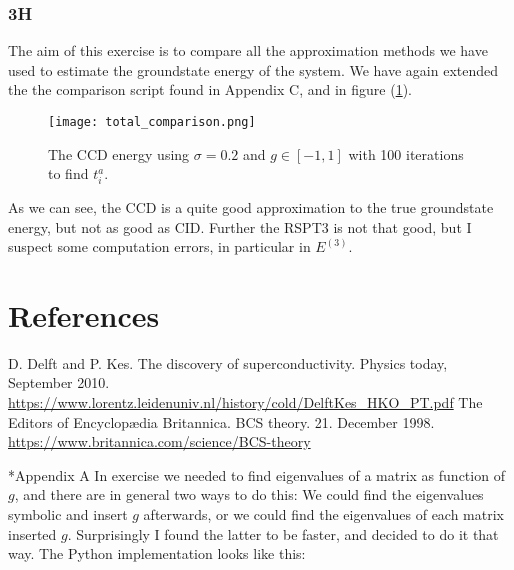 \documentclass[norsk,a4paper,12pt]{article}
\begin{document}
\subsubsection*{3H}
The aim of this exercise is to compare all the approximation methods we have used to estimate the groundstate energy of the system. We have again extended the the comparison script found in Appendix C, and in figure (\ref{fig:total_comparison}).
\begin{figure}[H]
\centering
\texttt{[image: total\_comparison.png]}
\caption{The CCD energy using $\sigma=0.2$ and $g\in[-1,1]$ with 100 iterations to find $t_i^a$. \label{fig:total_comparison}}
\end{figure}
As we can see, the CCD is a quite good approximation to the true groundstate energy, but not as good as CID. Further the RSPT3 is not that good, but I suspect some computation errors, in particular in $E^{(3)}$.

\section{References}
\begingroup
\renewcommand{\section}[2]{}
\begin{thebibliography}{}
  D. Delft and P. Kes. 
  The discovery of superconductivity. 
  Physics today, September 2010. 
  \url{https://www.lorentz.leidenuniv.nl/history/cold/DelftKes_HKO_PT.pdf}
  The Editors of Encyclopædia Britannica. 
  BCS theory. 
  21. December 1998. 
  \url{https://www.britannica.com/science/BCS-theory}
\end{thebibliography}
\endgroup

\section{Appendices}
\subsection*{Appendix A}
In exercise we needed to find eigenvalues of a matrix as function of $g$, and there are in general two ways to do this: We could find the eigenvalues symbolic and insert $g$ afterwards, or we could find the eigenvalues of each matrix inserted $g$. Surprisingly I found the latter to be faster, and decided to do it that way. The Python implementation looks like this:

\end{document}
